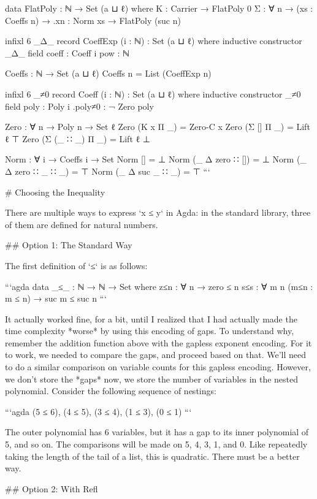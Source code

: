 \documentclass{article}
\begin{document}
  data FlatPoly : ℕ → Set (a ⊔ ℓ) where
    Κ : Carrier → FlatPoly 0
    Σ : ∀ {n} → (xs : Coeffs n) → .{xn : Norm xs} → FlatPoly (suc n)

  infixl 6 _Δ_
  record CoeffExp (i : ℕ) : Set (a ⊔ ℓ) where
    inductive
    constructor _Δ_
    field
      coeff : Coeff i
      pow   : ℕ

  Coeffs : ℕ → Set (a ⊔ ℓ)
  Coeffs n = List (CoeffExp n)

  infixl 6 _≠0
  record Coeff (i : ℕ) : Set (a ⊔ ℓ) where
    inductive
    constructor _≠0
    field
      poly : Poly i
      .{poly≠0} : ¬ Zero poly

  Zero : ∀ {n} → Poly n → Set ℓ
  Zero (Κ x       Π _) = Zero-C x
  Zero (Σ []      Π _) = Lift ℓ ⊤
  Zero (Σ (_ ∷ _) Π _) = Lift ℓ ⊥

  Norm : ∀ {i} → Coeffs i → Set
  Norm []                  = ⊥
  Norm (_ Δ zero  ∷ [])    = ⊥
  Norm (_ Δ zero  ∷ _ ∷ _) = ⊤
  Norm (_ Δ suc _ ∷ _)     = ⊤
```

# Choosing the Inequality

There are multiple ways to express `x ≤ y` in Agda: in the standard library,
three of them are defined for natural numbers.

## Option 1: The Standard Way

The first definition of `≤` is as follows:

```agda
data _≤_ : ℕ → ℕ → Set where
   z≤n : ∀ {n}                 → zero  ≤ n
   s≤s : ∀ {m n} (m≤n : m ≤ n) → suc m ≤ suc n
```

It actually worked fine, for a bit, until I realized that I had actually made
the time complexity *worse* by using this encoding of gaps. To understand why,
remember the addition function above with the gapless exponent encoding. For it to
work, we needed to compare the gaps, and proceed based on that. We'll need to do
a similar comparison on variable counts for this gapless encoding. However, we
don't store the *gaps* now, we store the number of variables in the nested
polynomial. Consider the following sequence of nestings:

```agda
(5 ≤ 6), (4 ≤ 5), (3 ≤ 4), (1 ≤ 3), (0 ≤ 1)
```

The outer polynomial has 6 variables, but it has a gap to its inner polynomial
of 5, and so on. The comparisons will be made on 5, 4, 3, 1, and 0. Like
repeatedly taking the length of the tail of a list, this is quadratic. There
must be a better way.

## Option 2: With Refl
\end{document}
